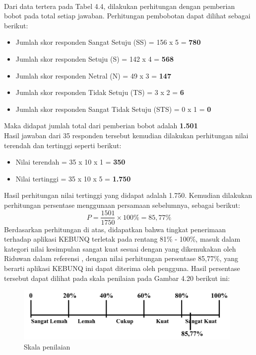 \begin{flushleft}
\begin{justify}
            \noindent \\Dari data tertera pada Tabel 4.4, dilakukan perhitungan dengan pemberian bobot pada total setiap jawaban.
            Perhitungan pembobotan dapat dilihat sebagai berikut:
            \begin{itemize}
                \item Jumlah skor responden Sangat Setuju (SS) = 156 x 5 = \textbf{780}
                \item Jumlah skor responden Setuju (S)  = 142 x 4 = \textbf{568}
                \item Jumlah skor responden Netral (N)  = 49 x 3 = \textbf{147}
                \item Jumlah skor responden Tidak Setuju (TS)  = 3 x 2 = \textbf{6}
                \item Jumlah skor responden Sangat Tidak Setuju (STS)  = 0 x 1 = \textbf{0}
            \end{itemize}
            Maka didapat jumlah total dari pemberian bobot adalah \textbf{1.501}\\
            Hasil jawaban dari 35 responden tersebut kemudian dilakukan perhitungan nilai terendah dan tertinggi seperti berikut:
            \begin{itemize}
                \item Nilai terendah = 35 x 10 x 1 = \textbf{350}
                \item Nilai tertinggi = 35 x 10 x 5 = \textbf{1.750}
             \end{itemize}
             Hasil perhitungan nilai tertinggi yang didapat adalah 1.750. Kemudian dilakukan perhitungan persentase menggunaan persamaan sebelumnya, sebagai berikut:
             \begin{equation}
                P = \frac{1501}{1750} \times 100\% = 85,77\%
             \end{equation}
             Berdasarkan perhitungan di atas, didapatkan bahwa tingkat penerimaan terhadap aplikasi KEBUNQ terletak pada rentang 81\% - 100\%, 
             masuk dalam kategori nilai kesimpulan sangat kuat sesuai dengan yang dikemukakan oleh Riduwan dalam referensi \cite{kuantitatif}, dengan nilai perhitungan persentase
             85,77\%, yang berarti aplikasi KEBUNQ ini dapat diterima oleh pengguna. Hasil persentase tersebut dapat dilihat pada skala penilaian pada Gambar 4.20 berikut ini:
             \begin{figure}[ht]
                \centering
                \includegraphics[width=11cm]{images/bab 4/persentase.png}
                \caption{Skala penilaian}
            \end{figure}



\end{justify}
\end{flushleft}
